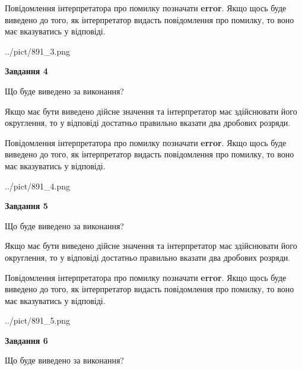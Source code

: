 \documentclass[12pt, ukrainian]{article}
\begin{document}
{\begin {Large}
Повідомлення інтерпретатора про помилку позначати \textbf{error}.
Якщо щось буде виведено до того, як інтерпретатор видасть повідомлення про помилку, 
то воно має вказуватись у відповіді. \par

\begin{center}
	{../pict/891_3.png}
\end{center}
\newpage

{\begin {center}\textbf{Завдання 4}\end {center}}\par
Що буде виведено за виконання? \par

Якщо має бути виведено дійсне значення та інтерпретатор має здійснювати його округлення, 
то у відповіді достатньо правильно вказати два дробових розряди.

Повідомлення інтерпретатора про помилку позначати \textbf{error}.
Якщо щось буде виведено до того, як інтерпретатор видасть повідомлення про помилку, 
то воно має вказуватись у відповіді. \par

\begin{center}
	{../pict/891_4.png}
\end{center}
\newpage

{\begin {center}\textbf{Завдання 5}\end {center}}\par
Що буде виведено за виконання? \par

Якщо має бути виведено дійсне значення та інтерпретатор має здійснювати його округлення, 
то у відповіді достатньо правильно вказати два дробових розряди.

Повідомлення інтерпретатора про помилку позначати \textbf{error}.
Якщо щось буде виведено до того, як інтерпретатор видасть повідомлення про помилку, 
то воно має вказуватись у відповіді. \par

\begin{center}
	{../pict/891_5.png}
\end{center}
\newpage

{\begin {center}\textbf{Завдання 6}\end {center}}\par
Що буде виведено за виконання? \par


\end{Large}}
\end{document}
